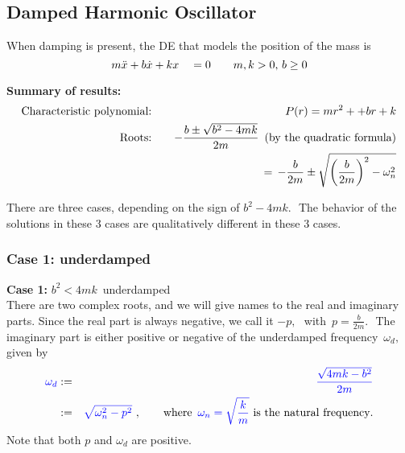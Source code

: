 \subsection{Damped Harmonic Oscillator}
When damping is present, the DE that models the position of the mass is
\begin{equation*}
  \displaystyle  \displaystyle m \ddot{x} + b \dot{x} + k x \quad \displaystyle = 
  \displaystyle  0 \qquad m,k>0,\,  b\geq 0
\end{equation*}

\textbf{Summary of results:}
\begin{eqnarray*}
  \text{Characteristic polynomial:} & \quad
  & P(r) =  mr^2 + + b r + k \\
  \displaystyle \text{Roots:}  & \quad
  & \displaystyle \displaystyle - \frac{b \pm \sqrt {b^2-4mk}}{2m}\, \text{ (by the quadratic formula)} \\
                                    & \quad
  & =\displaystyle \,
    -\frac{b}{2m} \pm \sqrt {\left(\frac{b}{2m}\right)^2 - \omega _ n^2}                                      
\end{eqnarray*}

There are three cases, depending on the sign of $b^2-4mk.\, \,$
The behavior of the solutions in these 3 cases are qualitatively different in these 3 cases.

\subsubsection{Case 1: underdamped}
\textbf{Case 1:} $b^2 < 4mk\,$ {\color{blue} underdamped} \\

There are two complex roots, and we will give names to the real and imaginary parts. Since the real part is always negative, we call it $-p, \, \,$ with $\displaystyle \, p=\frac{b}{2m}.\, \,$
The imaginary part is either positive or negative of the {\color{blue} underdamped frequency}
$\, \omega _ d,\,$ given by
\begin{eqnarray*}
  \displaystyle  \displaystyle {\color{blue}{\omega _ d}}
  & : \displaystyle = & \displaystyle {\color{blue}{\frac{\sqrt {4mk-b^2}}{2m} }} \\
  & : \displaystyle = & \displaystyle  {\color{blue}{ \sqrt {\omega _ n^2-p^2} }} \
                        ,\qquad \text {where } \, {\color{blue}{\omega _ n=\sqrt {\frac{k}{m}} }}
                        \, \, \text {is the natural frequency}.
\end{eqnarray*}
Note that both $p$ and $\omega _d$ are positive.\\

